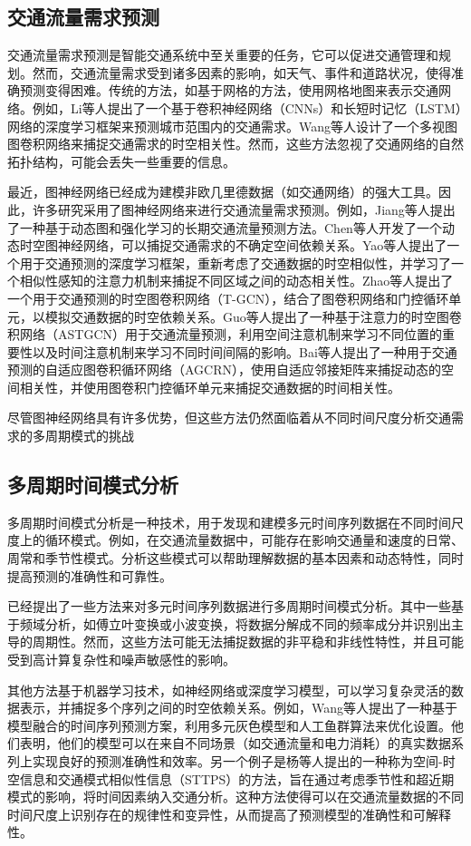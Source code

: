 \documentclass[10.5pt,compsoc,UTF8]{CjC}
\theoremstyle{mystyle}
\begin{document}
\subsection{交通流量需求预测}
交通流量需求预测是智能交通系统中至关重要的任务，它可以促进交通管理和规划。然而，交通流量需求受到诸多因素的影响，如天气、事件和道路状况，使得准确预测变得困难。传统的方法，如基于网格的方法，使用网格地图来表示交通网络。例如，Li等人提出了一个基于卷积神经网络（CNNs）和长短时记忆（LSTM）网络的深度学习框架来预测城市范围内的交通需求。Wang等人设计了一个多视图图卷积网络来捕捉交通需求的时空相关性。然而，这些方法忽视了交通网络的自然拓扑结构，可能会丢失一些重要的信息。

最近，图神经网络已经成为建模非欧几里德数据（如交通网络）的强大工具。因此，许多研究采用了图神经网络来进行交通流量需求预测。例如，Jiang等人提出了一种基于动态图和强化学习的长期交通流量预测方法。Chen等人开发了一个动态时空图神经网络，可以捕捉交通需求的不确定空间依赖关系。Yao等人提出了一个用于交通预测的深度学习框架，重新考虑了交通数据的时空相似性，并学习了一个相似性感知的注意力机制来捕捉不同区域之间的动态相关性。Zhao等人提出了一个用于交通预测的时空图卷积网络（T-GCN），结合了图卷积网络和门控循环单元，以模拟交通数据的时空依赖关系。Guo等人提出了一种基于注意力的时空图卷积网络（ASTGCN）用于交通流量预测，利用空间注意机制来学习不同位置的重要性以及时间注意机制来学习不同时间间隔的影响。Bai等人提出了一种用于交通预测的自适应图卷积循环网络（AGCRN），使用自适应邻接矩阵来捕捉动态的空间相关性，并使用图卷积门控循环单元来捕捉交通数据的时间相关性。

尽管图神经网络具有许多优势，但这些方法仍然面临着从不同时间尺度分析交通需求的多周期模式的挑战
\subsection{多周期时间模式分析}
多周期时间模式分析是一种技术，用于发现和建模多元时间序列数据在不同时间尺度上的循环模式。例如，在交通流量数据中，可能存在影响交通量和速度的日常、周常和季节性模式。分析这些模式可以帮助理解数据的基本因素和动态特性，同时提高预测的准确性和可靠性。

已经提出了一些方法来对多元时间序列数据进行多周期时间模式分析。其中一些基于频域分析，如傅立叶变换或小波变换，将数据分解成不同的频率成分并识别出主导的周期性。然而，这些方法可能无法捕捉数据的非平稳和非线性特性，并且可能受到高计算复杂性和噪声敏感性的影响。

其他方法基于机器学习技术，如神经网络或深度学习模型，可以学习复杂灵活的数据表示，并捕捉多个序列之间的时空依赖关系。例如，Wang等人提出了一种基于模型融合的时间序列预测方案，利用多元灰色模型和人工鱼群算法来优化设置。他们表明，他们的模型可以在来自不同场景（如交通流量和电力消耗）的真实数据系列上实现良好的预测准确性和效率。另一个例子是杨等人提出的一种称为空间-时空信息和交通模式相似性信息（STTPS）的方法，旨在通过考虑季节性和超近期模式的影响，将时间因素纳入交通分析。这种方法使得可以在交通流量数据的不同时间尺度上识别存在的规律性和变异性，从而提高了预测模型的准确性和可解释性。
\end{document}
